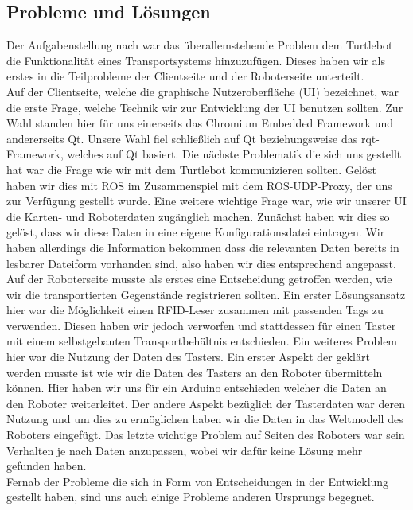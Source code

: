 \documentclass[a4paper,12pt,headsepline]{scrartcl}
\begin{document}
	\subsection{Probleme und Lösungen}
Der Aufgabenstellung nach war das überallemstehende Problem dem Turtlebot die Funktionalität eines Transportsystems hinzuzufügen. Dieses haben wir als erstes in die Teilprobleme der Clientseite und der Roboterseite unterteilt.\\
Auf der Clientseite, welche die graphische Nutzeroberfläche (UI) bezeichnet, war die erste Frage, welche Technik wir zur Entwicklung der UI benutzen sollten. Zur Wahl standen hier für uns einerseits das Chromium Embedded Framework und andererseits Qt. Unsere Wahl fiel schließlich auf Qt beziehungsweise das rqt-Framework, welches auf Qt basiert. Die nächste Problematik die sich uns gestellt hat war die Frage wie wir mit dem Turtlebot kommunizieren sollten. Gelöst haben wir dies mit ROS im Zusammenspiel mit dem ROS-UDP-Proxy, der uns zur Verfügung gestellt wurde. Eine weitere wichtige Frage war, wie wir unserer UI die Karten- und Roboterdaten zugänglich machen. Zunächst haben wir dies so gelöst, dass wir diese Daten in eine eigene Konfigurationsdatei eintragen. Wir haben allerdings die Information bekommen dass die relevanten Daten bereits in lesbarer Dateiform vorhanden sind, also haben wir dies entsprechend angepasst.\\
Auf der Roboterseite musste als erstes eine Entscheidung getroffen werden, wie wir die transportierten Gegenstände registrieren sollten. Ein erster Lösungsansatz hier war die Möglichkeit einen RFID-Leser zusammen mit passenden Tags zu verwenden. Diesen haben wir jedoch verworfen und stattdessen für einen Taster mit einem selbstgebauten Transportbehältnis entschieden. Ein weiteres Problem hier war die Nutzung der Daten des Tasters. Ein erster Aspekt der geklärt werden musste ist wie wir die Daten des Tasters an den Roboter übermitteln können. Hier haben wir uns für ein Arduino entschieden welcher die Daten an den Roboter weiterleitet. Der andere Aspekt bezüglich der Tasterdaten war deren Nutzung und um dies zu ermöglichen haben wir die Daten in das Weltmodell des Roboters eingefügt. Das letzte wichtige Problem auf Seiten des Roboters war sein Verhalten je nach Daten anzupassen, wobei wir dafür keine Lösung mehr gefunden haben.\\
Fernab der Probleme die sich in Form von Entscheidungen in der Entwicklung gestellt haben, sind uns auch einige Probleme anderen Ursprungs begegnet.\\
\end{document}
